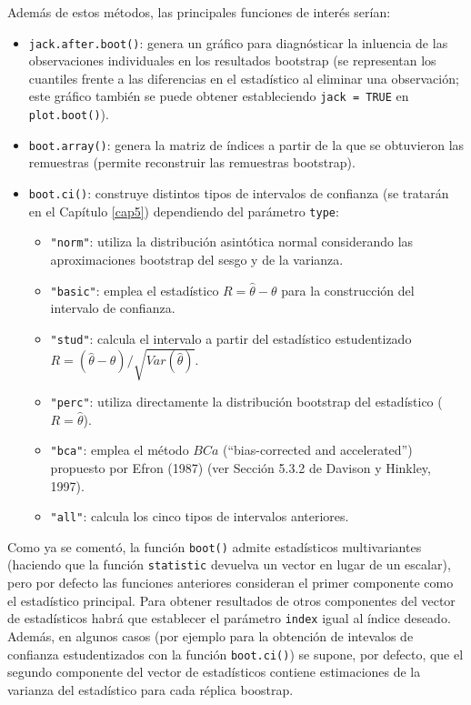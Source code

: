 \documentclass[]{book}
\theoremstyle{definition}
\theoremstyle{definition}
\theoremstyle{definition}
\theoremstyle{remark}
\begin{document}
Además de estos métodos, las principales funciones de interés serían:

\begin{itemize}
\item
  \texttt{jack.after.boot()}: genera un gráfico para diagnósticar la
  inluencia de las observaciones individuales en los resultados
  bootstrap (se representan los cuantiles frente a las diferencias en el
  estadístico al eliminar una observación; este gráfico también se puede
  obtener estableciendo \texttt{jack\ =\ TRUE} en \texttt{plot.boot()}).
\item
  \texttt{boot.array()}: genera la matriz de índices a partir de la que
  se obtuvieron las remuestras (permite reconstruir las remuestras
  bootstrap).
\item
  \texttt{boot.ci()}: construye distintos tipos de intervalos de
  confianza (se tratarán en el Capítulo \ref{cap5}) dependiendo del
  parámetro \texttt{type}:

  \begin{itemize}
  \item
    \texttt{"norm"}: utiliza la distribución asintótica normal
    considerando las aproximaciones bootstrap del sesgo y de la
    varianza.
  \item
    \texttt{"basic"}: emplea el estadístico \(R = \hat \theta - \theta\)
    para la construcción del intervalo de confianza.
  \item
    \texttt{"stud"}: calcula el intervalo a partir del estadístico
    estudentizado
    \(R = \left( \hat \theta - \theta \right) / \sqrt{Var(\hat \theta)}\).
  \item
    \texttt{"perc"}: utiliza directamente la distribución bootstrap del
    estadístico (\(R = \hat \theta\)).
  \item
    \texttt{"bca"}: emplea el método \(BCa\) (``bias-corrected and
    accelerated'') propuesto por Efron (1987) (ver Sección 5.3.2 de
    Davison y Hinkley, 1997).
  \item
    \texttt{"all"}: calcula los cinco tipos de intervalos anteriores.
  \end{itemize}
\end{itemize}

Como ya se comentó, la función \texttt{boot()} admite estadísticos
multivariantes (haciendo que la función \texttt{statistic} devuelva un
vector en lugar de un escalar), pero por defecto las funciones
anteriores consideran el primer componente como el estadístico
principal. Para obtener resultados de otros componentes del vector de
estadísticos habrá que establecer el parámetro \texttt{index} igual al
índice deseado. Además, en algunos casos (por ejemplo para la obtención
de intevalos de confianza estudentizados con la función
\texttt{boot.ci()}) se supone, por defecto, que el segundo componente
del vector de estadísticos contiene estimaciones de la varianza del
estadístico para cada réplica boostrap.
\end{document}
